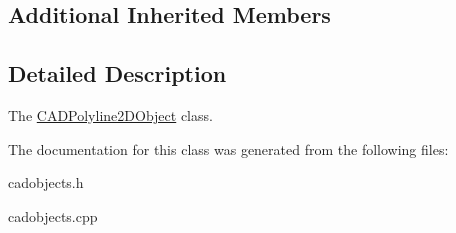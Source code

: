 \subsection*{Additional Inherited Members}


\subsection{Detailed Description}
The \hyperlink{class_c_a_d_polyline2_d_object}{C\+A\+D\+Polyline2\+D\+Object} class. 

The documentation for this class was generated from the following files\+:\begin{DoxyCompactItemize}
\item 
cadobjects.\+h\item 
cadobjects.\+cpp\end{DoxyCompactItemize}
